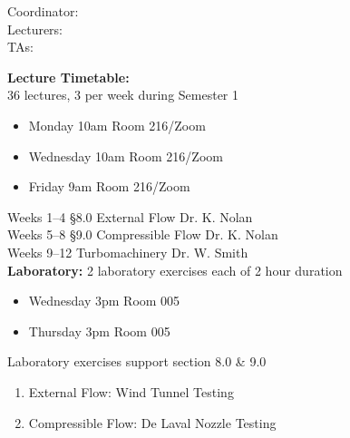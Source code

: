 
\maketitle
\makeatletter

\noindent Coordinator: \@modulecoord \\
Lecturers: \@modulelecturers \\
TAs: \@moduletas
\makeatother

\textbf{Lecture Timetable:}\\
36 lectures, 3 per week during Semester 1
\begin{itemize}
    \item[] Monday 10am Room 216/Zoom
    \item[] Wednesday 10am Room 216/Zoom
    \item[] Friday 9am Room 216/Zoom
\end{itemize}
Weeks 1--4 §8.0 External Flow Dr. K. Nolan\\
Weeks 5--8 §9.0 Compressible Flow Dr. K. Nolan\\
Weeks 9--12 Turbomachinery Dr. W. Smith\\
\textbf{Laboratory:}
2 laboratory exercises each of 2 hour duration
\begin{itemize}
    \item[] Wednesday 3pm Room 005
    \item[] Thursday 3pm Room 005
\end{itemize}
Laboratory exercises support section 8.0 \& 9.0
\begin{enumerate}
    \item External Flow: Wind Tunnel Testing
    \item Compressible Flow: De Laval Nozzle Testing
\end{enumerate}

